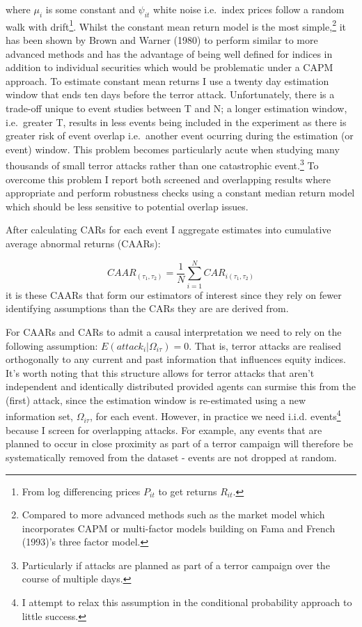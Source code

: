 \documentclass[]{AEA}
\begin{document}
where \(\mu_i\) is some constant and \(\psi_{it}\) white noise
i.e.~index prices follow a random walk with drift\footnote{From log
  differencing prices \(P_{it}\) to get returns \(R_{it}\).}. Whilst the
constant mean return model is the most simple,\footnote{Compared to more
  advanced methods such as the market model which incorporates CAPM or
  multi-factor models building on Fama and French (1993)'s three factor
  model.} it has been shown by Brown and Warner (1980) to perform
similar to more advanced methods and has the advantage of being well
defined for indices in addition to individual securities which would be
problematic under a CAPM approach. To estimate constant mean returns I
use a twenty day estimation window that ends ten days before the terror
attack. Unfortunately, there is a trade-off unique to event studies
between T and N; a longer estimation window, i.e.~greater T, results in
less events being included in the experiment as there is greater risk of
event overlap i.e.~another event ocurring during the estimation (or
event) window. This problem becomes particularly acute when studying
many thousands of small terror attacks rather than one catastrophic
event.\footnote{Particularly if attacks are planned as part of a terror
  campaign over the course of multiple days.} To overcome this problem I
report both screened and overlapping results where appropriate and
perform robustness checks using a constant median return model which
should be less sensitive to potential overlap issues.

After calculating CARs for each event I aggregate estimates into
cumulative average abnormal returns (CAARs):

\[CAAR_{(\tau_{1},\tau_{2})}=\frac{1}N \sum_{i=1}^{N} CAR_{i(\tau_{1},\tau_{2})}\]
it is these CAARs that form our estimators of interest since they rely
on fewer identifying assumptions than the CARs they are are derived
from.

For CAARs and CARs to admit a causal interpretation we need to rely on
the following assumption: \(E(\textit{attack}_i | \Omega_{i\tau}) = 0\).
That is, terror attacks are realised orthogonally to any current and
past information that influences equity indices. It's worth noting that
this structure allows for terror attacks that aren't independent and
identically distributed provided agents can surmise this from the
(first) attack, since the estimation window is re-estimated using a new
information set, \(\Omega_{i\tau}\), for each event. However, in
practice we need i.i.d. events\footnote{I attempt to relax this
  assumption in the conditional probability approach to little success.}
because I screen for overlapping attacks. For example, any events that
are planned to occur in close proximity as part of a terror campaign
will therefore be systematically removed from the dataset - events are
not dropped at random.
\end{document}
